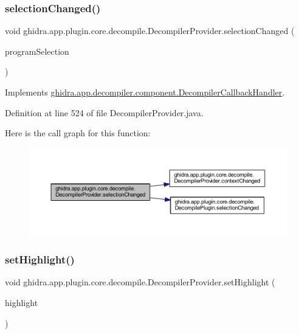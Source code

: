 \subsubsection{\texorpdfstring{selectionChanged()}{selectionChanged()}}
{\footnotesize\ttfamily void ghidra.\+app.\+plugin.\+core.\+decompile.\+Decompiler\+Provider.\+selection\+Changed (\begin{DoxyParamCaption}\item[{Program\+Selection}]{program\+Selection }\end{DoxyParamCaption})\hspace{0.3cm}{\ttfamily [inline]}}



Implements \mbox{\hyperlink{interfaceghidra_1_1app_1_1decompiler_1_1component_1_1_decompiler_callback_handler_a9dc1e47dfe1bdecaa25b5db9d06cd1d7}{ghidra.\+app.\+decompiler.\+component.\+Decompiler\+Callback\+Handler}}.



Definition at line 524 of file Decompiler\+Provider.\+java.

Here is the call graph for this function\+:
\nopagebreak
\begin{figure}[H]
\begin{center}
\leavevmode
\includegraphics[width=350pt]{classghidra_1_1app_1_1plugin_1_1core_1_1decompile_1_1_decompiler_provider_af5b6c269879799df67d4594c6df80434_cgraph}
\end{center}
\end{figure}
\mbox{\label{classghidra_1_1app_1_1plugin_1_1core_1_1decompile_1_1_decompiler_provider_a70d281d89b70480c49cf4463c829130d}} 
\subsubsection{\texorpdfstring{setHighlight()}{setHighlight()}}
{\footnotesize\ttfamily void ghidra.\+app.\+plugin.\+core.\+decompile.\+Decompiler\+Provider.\+set\+Highlight (\begin{DoxyParamCaption}\item[{Program\+Selection}]{highlight }\end{DoxyParamCaption})\hspace{0.3cm}{\ttfamily [inline]}}



